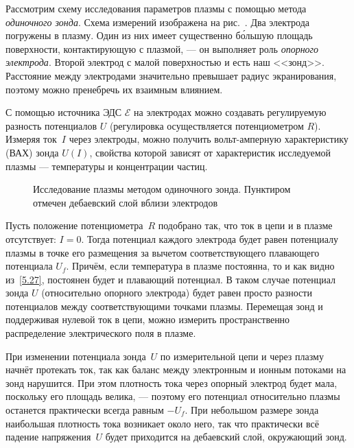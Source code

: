 
Рассмотрим схему исследования параметров плазмы с помощью метода
\emph{одиночного зонда}.
Схема измерений изображена на рис.~. 
Два электрода погружены в плазму.
Один из них имеет существенно б\'{о}льшую 
площадь поверхности, контактирующую с плазмой,
--- он выполняет роль \emph{опорного электрода}.
Второй электрод с малой поверхностью и есть наш <<зонд>>.
Расстояние между электродами значительно превышает радиус экранирования,
поэтому можно пренебречь их взаимным влиянием. 

С помощью источника ЭДС $\mathcal{E}$ на электродах 
можно создавать регулируемую разность потенциалов $U$
(регулировка осуществляется потенциометром $R$).
Измеряя ток~$I$ через электроды, можно получить 
вольт-амперную характеристику (ВАХ) зонда $U(I)$,
свойства которой зависят от характеристик исследуемой плазмы ---
температуры и концентрации частиц.

\begin{figure}[h]
	\centering
	\caption{Исследование плазмы методом одиночного зонда. Пунктиром
        отмечен дебаевский слой вблизи электродов}
\end{figure}


Пусть положение потенциометра~$R$ подобрано так, что
ток в цепи и в плазме отсутствует: $I=0$.
Тогда потенциал каждого электрода будет равен потенциалу плазмы 
в точке его размещения за вычетом соответствующего плавающего потенциала $U_f$.
Причём, если температура в плазме постоянна, то и как видно из~\eqref{5.27},
постоянен будет и плавающий потенциал. В таком случае потенциал зонда $U$ 
(относительно опорного электрода) будет равен просто разности потенциалов 
между соответствующими точками плазмы. Перемещая зонд
и поддерживая нулевой ток в цепи, можно измерить 
пространственно распределение электрического поля в плазме.

При изменении потенциала зонда~$U$ по измерительной цепи и через плазму
начнёт протекать ток, так как баланс между электронным и ионным потоками 
на зонд нарушится. 
При этом плотность тока через опорный электрод будет мала,
поскольку его площадь велика, --- поэтому его потенциал относительно плазмы
останется практически всегда равным $-U_f$. При небольшом размере зонда наибольшая
плотность тока возникает около него, так что практически всё падение 
напряжения~$U$ будет приходится на дебаевский слой, окружающий зонд.
 
